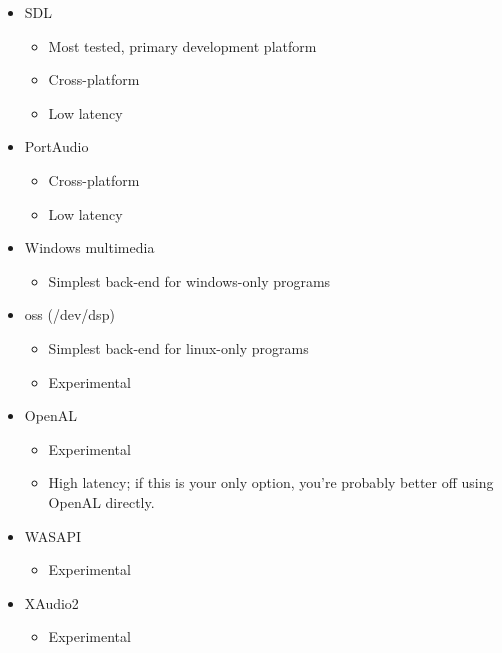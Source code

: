 \begin{itemize}
\item SDL 
\begin{itemize}
\item Most tested, primary development platform
\item Cross-platform
\item Low latency
\end{itemize}
\item PortAudio
\begin{itemize}
\item Cross-platform
\item Low latency
\end{itemize}
\item Windows multimedia
\begin{itemize}
\item Simplest back-end for windows-only programs
\end{itemize}
\item oss (/dev/dsp)
\begin{itemize}
\item Simplest back-end for linux-only programs
\item Experimental
\end{itemize}
\item OpenAL
\begin{itemize}
\item Experimental
\item High latency; if this is your only option, you're probably better off using OpenAL directly.
\end{itemize}
\item WASAPI
\begin{itemize}
\item Experimental
\end{itemize}
\item XAudio2
\begin{itemize}
\item Experimental
\end{itemize}
\end{itemize}